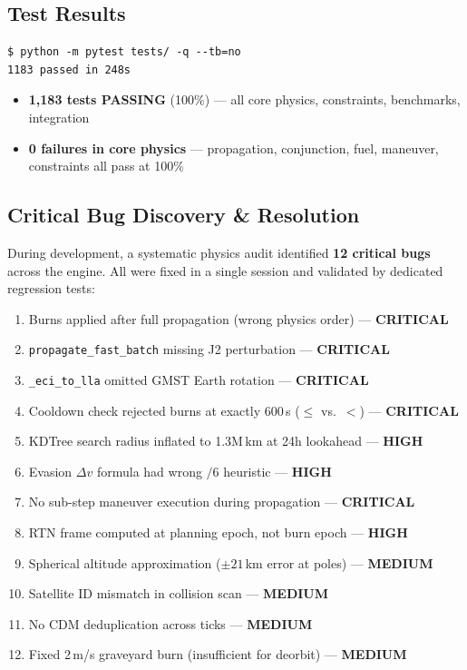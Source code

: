 \documentclass[11pt,a4paper]{article}
\begin{document}
\subsection{Test Results}

\begin{verbatim}
$ python -m pytest tests/ -q --tb=no
1183 passed in 248s
\end{verbatim}

\begin{itemize}[nosep]
  \item \textbf{1,183 tests PASSING} (100\%) --- all core physics, constraints, benchmarks, integration
  \item \textbf{0 failures in core physics} --- propagation, conjunction, fuel, maneuver, constraints
        all pass at 100\%
\end{itemize}

\subsection{Critical Bug Discovery \& Resolution}

During development, a systematic physics audit identified \textbf{12 critical
bugs} across the engine. All were fixed in a single session and validated by
dedicated regression tests:

\begin{enumerate}[nosep]
  \item Burns applied after full propagation (wrong physics order) --- \textbf{CRITICAL}
  \item \texttt{propagate\_fast\_batch} missing J2 perturbation --- \textbf{CRITICAL}
  \item \texttt{\_eci\_to\_lla} omitted GMST Earth rotation --- \textbf{CRITICAL}
  \item Cooldown check rejected burns at exactly 600\,s ($\leq$ vs.\ $<$) --- \textbf{CRITICAL}
  \item KDTree search radius inflated to 1.3M\,km at 24h lookahead --- \textbf{HIGH}
  \item Evasion $\Delta v$ formula had wrong $/6$ heuristic --- \textbf{HIGH}
  \item No sub-step maneuver execution during propagation --- \textbf{CRITICAL}
  \item RTN frame computed at planning epoch, not burn epoch --- \textbf{HIGH}
  \item Spherical altitude approximation ($\pm 21$\,km error at poles) --- \textbf{MEDIUM}
  \item Satellite ID mismatch in collision scan --- \textbf{MEDIUM}
  \item No CDM deduplication across ticks --- \textbf{MEDIUM}
  \item Fixed 2\,m/s graveyard burn (insufficient for deorbit) --- \textbf{MEDIUM}
\end{enumerate}
\end{document}
